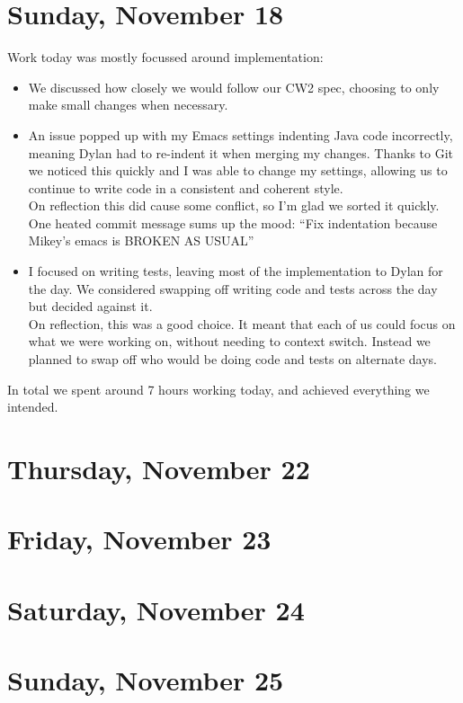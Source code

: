 \documentclass[titlepage, 12pt]{extarticle}
\begin{document}
\section{Sunday, November 18}
Work today was mostly focussed around implementation:
\begin{itemize}
\item We discussed how closely we would follow our CW2 spec, choosing to only make small changes when necessary. 
\item An issue popped up with my Emacs settings indenting Java code incorrectly, meaning Dylan had to re-indent it when merging my changes. Thanks to Git we noticed this quickly and I was able to change my settings, allowing us to continue to write code in a consistent and coherent style. \\ On reflection this did cause some conflict, so I'm glad we sorted it quickly. One heated commit message sums up the mood: ``Fix indentation because Mikey's emacs is BROKEN AS USUAL''
\item I focused on writing tests, leaving most of the implementation to Dylan for the day. We considered swapping off writing code and tests across the day but decided against it. \\ On reflection, this was a good choice. It meant that each of us could focus on what we were working on, without needing to context switch. Instead we planned to swap off who would be doing code and tests on alternate days. 
\end{itemize}

In total we spent around 7 hours working today, and achieved everything we intended. 

\section{Thursday, November 22}
\section{Friday, November 23}
\section{Saturday, November 24}
\section{Sunday, November 25}
\end{document}
